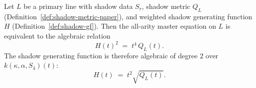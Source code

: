\begin{theorem}
\label{thm:riccati-algebraicity}
Let $L$ be a primary line with shadow data $S_r$, shadow metric
$Q_L$ \textup{(}Definition~\textup{\ref{def:shadow-metric-paper}}\textup{)},
and weighted shadow generating function $H$
\textup{(}Definition~\textup{\ref{def:shadow-gf}}\textup{)}.
Then the all-arity master equation on $L$ is equivalent to the
algebraic relation
\begin{equation}
\label{eq:riccati-algebraic-relation}
 H(t)^2 \;=\; t^4 \, Q_L(t).
\end{equation}
The shadow generating function is therefore algebraic of
degree $2$ over $k(\kappa, \alpha, S_4)(t)$:
\begin{equation}
\label{eq:shadow-closed-form}
 H(t) \;=\; t^2 \sqrt{Q_L(t)}.
\end{equation}
\end{theorem}

